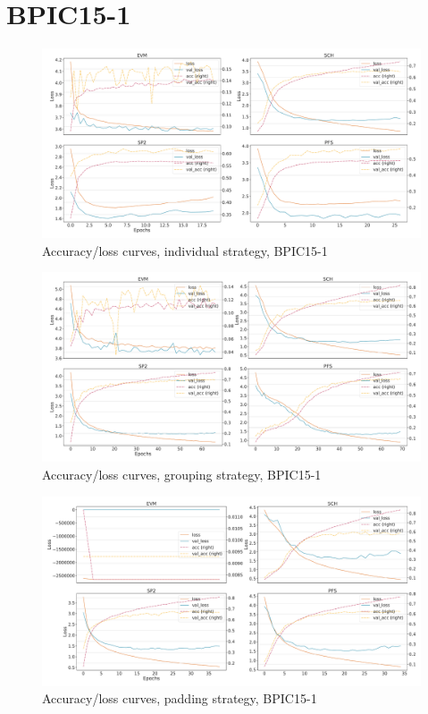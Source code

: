 \section*{BPIC15-1}
\begin{figure}[!htb]
    \centering
    \includegraphics[width=\textwidth]{gfx/bpic2015_1/individual_loss_acc_curve.pdf}
    \caption{Accuracy/loss curves, individual strategy, BPIC15-1}
\end{figure}
\begin{figure}[!htb]
    \centering
    \includegraphics[width=\textwidth]{gfx/bpic2015_1/grouped_loss_acc_curve.pdf}
    \caption{Accuracy/loss curves, grouping strategy, BPIC15-1}
\end{figure}
\begin{figure}[!htb]
    \centering
    \includegraphics[width=\textwidth]{gfx/bpic2015_1/padded_loss_acc_curve.pdf}
    \caption{Accuracy/loss curves, padding strategy, BPIC15-1}
\end{figure}
